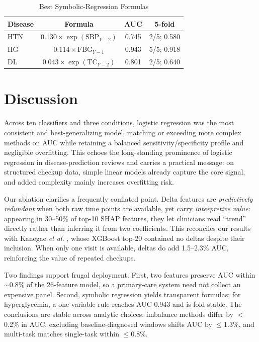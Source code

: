 \documentclass[journal]{IEEEtran}
\begin{document}
\begin{table}[!t]
\caption{Best Symbolic-Regression Formulas}
\label{tab:sr}
\centering
\begin{tabular}{@{}lccc@{}}
\toprule
Disease & Formula & AUC & 5-fold \\
\midrule
HTN & $0.130\times\exp(\mathrm{SBP}_{Y-2})$ & 0.745 & 2/5; 0.580 \\
HG & $0.114\times\mathrm{FBG}_{Y-1}$ & 0.943 & 5/5; 0.918 \\
DL & $0.043\times\exp(\mathrm{TC}_{Y-2})$ & 0.801 & 2/5; 0.640 \\
\bottomrule
\end{tabular}
\end{table}

\section{Discussion}
Across ten classifiers and three conditions, logistic regression was the most consistent and best-generalizing model, matching or exceeding more complex methods on AUC while retaining a balanced sensitivity/specificity profile and negligible overfitting. This echoes the long-standing prominence of logistic regression in disease-prediction reviews \cite{ref18} and carries a practical message: on structured checkup data, simple linear models already capture the core signal, and added complexity mainly increases overfitting risk.

Our ablation clarifies a frequently conflated point. Delta features are \emph{predictively redundant} when both raw time points are available, yet carry \emph{interpretive value}: appearing in 30--50\% of top-10 SHAP features, they let clinicians read ``trend'' directly rather than inferring it from two coefficients. This reconciles our results with Kanegae \textit{et al.} \cite{ref9}, whose XGBoost top-20 contained no deltas despite their inclusion. When only one visit is available, deltas do add 1.5--2.3\% AUC, reinforcing the value of repeated checkups.

Two findings support frugal deployment. First, two features preserve AUC within $\sim$0.8\% of the 26-feature model, so a primary-care system need not collect an expensive panel. Second, symbolic regression yields transparent formulas; for hyperglycemia, a one-variable rule reaches AUC 0.943 and is fold-stable. The conclusions are stable across analytic choices: imbalance methods differ by $<$0.2\% in AUC, excluding baseline-diagnosed windows shifts AUC by $\leq$1.3\%, and multi-task matches single-task within $\leq$0.8\%.
\end{document}
